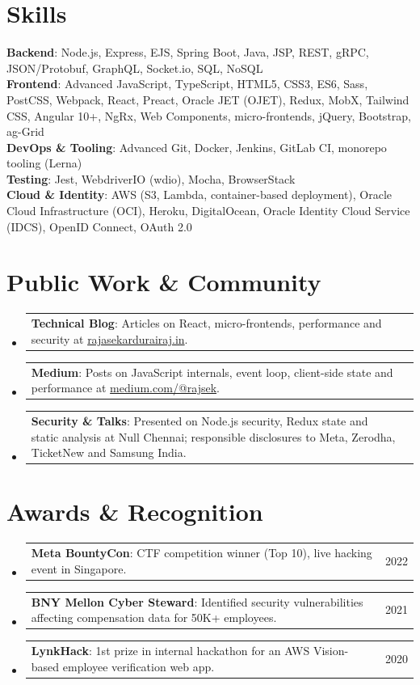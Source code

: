 \documentclass[a4paper,11pt]{article}
\makeatletter
\newcommand{\resumeProjectHeading}[2]{
    \item
    \begin{tabular*}{0.97\textwidth}{l@{\extracolsep{\fill}}r}
      \small #1 & #2 \\
    \end{tabular*}\vspace{-7pt}
}
\newcommand{\resumeSubHeadingListStart}{\begin{itemize}[leftmargin=0.15in, label={}]}
\newcommand{\resumeSubHeadingListEnd}{\end{itemize}}
\makeatother
\begin{document}
\section{Skills}
 \begin{itemize}[leftmargin=0.15in, label={}]
    \small{\item{
     \textbf{Backend}{: Node.js, Express, EJS, Spring Boot, Java, JSP, REST, gRPC, JSON/Protobuf, GraphQL, Socket.io, SQL, NoSQL} \\
     \textbf{Frontend}{: Advanced JavaScript, TypeScript, HTML5, CSS3, ES6, Sass, PostCSS, Webpack, React, Preact, Oracle JET (OJET), Redux, MobX, Tailwind CSS, Angular 10+, NgRx, Web Components, micro-frontends, jQuery, Bootstrap, ag-Grid} \\
     \textbf{DevOps \& Tooling}{: Advanced Git, Docker, Jenkins, GitLab CI, monorepo tooling (Lerna)} \\
     \textbf{Testing}{: Jest, WebdriverIO (wdio), Mocha, BrowserStack} \\
     \textbf{Cloud \& Identity}{: AWS (S3, Lambda, container-based deployment), Oracle Cloud Infrastructure (OCI), Heroku, DigitalOcean, Oracle Identity Cloud Service (IDCS), OpenID Connect, OAuth 2.0}
    }}
 \end{itemize}

\section{Public Work \& Community}
  \resumeSubHeadingListStart
    \resumeProjectHeading
      {\textbf{Technical Blog}{: Articles on React, micro-frontends, performance and security at \href{https://www.rajasekardurairaj.in}{rajasekardurairaj.in}.}}{}
    \resumeProjectHeading
      {\textbf{Medium}{: Posts on JavaScript internals, event loop, client-side state and performance at \href{https://medium.com/@rajsek}{medium.com/@rajsek}.}}{}
    \resumeProjectHeading
      {\textbf{Security \& Talks}{: Presented on Node.js security, Redux state and static analysis at Null Chennai; responsible disclosures to Meta, Zerodha, TicketNew and Samsung India.}}{}
  \resumeSubHeadingListEnd

\section{Awards \& Recognition}
  \resumeSubHeadingListStart
    \resumeProjectHeading
      {\textbf{Meta BountyCon}{: CTF competition winner (Top 10), live hacking event in Singapore.}}{2022}
    \resumeProjectHeading
      {\textbf{BNY Mellon Cyber Steward}{: Identified security vulnerabilities affecting compensation data for 50K+ employees.}}{2021}
    \resumeProjectHeading
      {\textbf{LynkHack}{: 1st prize in internal hackathon for an AWS Vision-based employee verification web app.}}{2020}
  \resumeSubHeadingListEnd
\end{document}
